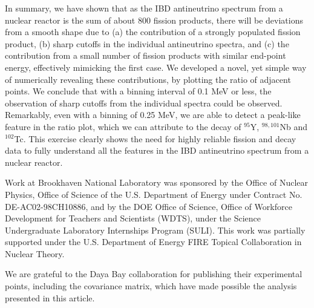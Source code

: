 \documentclass[twocolumn,amsmath,amssymb,10pt,superscriptaddress,a4paper,letterpaper,fleqn]{revtex4-1}
\begin{document}
In summary, we have shown that as the IBD antineutrino spectrum from a nuclear reactor is the sum of about 800 fission products, 
there will be deviations from a smooth shape due to 
(a) the contribution of a strongly populated fission product, 
(b) sharp cutoffs in the individual antineutrino spectra,
and (c) the contribution from a small number of fission products with similar end-point energy, effectively mimicking the first case.
We developed a novel, yet simple way of numerically revealing these contributions, by plotting the ratio of adjacent points. 
We conclude that with a binning interval of 0.1 MeV or less, the observation of sharp cutoffs from the individual spectra could be observed.
Remarkably, even with a binning of 0.25 MeV, we are able to detect a peak-like feature in the ratio plot, which we can attribute to the decay of 
$^{95}$Y, $^{98,101}$Nb and $^{102}$Tc.
This exercise clearly shows the need for highly reliable fission and decay data to fully understand all the features in the IBD antineutrino spectrum from 
a nuclear reactor.




\begin{acknowledgements} 
Work at Brookhaven National Laboratory was sponsored by the Office of Nuclear Physics, Office of Science of the U.S.  
Department of Energy under Contract No. DE-AC02-98CH10886, and by the
DOE Office of Science, Office of Workforce Development
for Teachers and Scientists (WDTS), under the Science
Undergraduate Laboratory Internships Program (SULI).
This work was partially supported under the U.S.
Department of Energy FIRE Topical Collaboration in Nuclear
Theory.

We are grateful to the Daya Bay collaboration for publishing their experimental points, including the covariance matrix, which have made possible  the analysis presented in this article.

\end{acknowledgements} 
  
\end{document}
